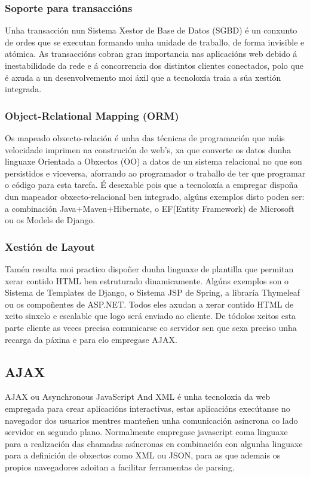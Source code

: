         \subsubsection{Soporte para transaccións}
            Unha transacción nun Sistema Xestor de Base de Datos (SGBD) é un conxunto de ordes que
            se executan formando unha unidade de traballo, de forma invisible e atómica. 
            As transaccións cobran gran importancia nas aplicacións web debido á inestabilidade 
            da rede e á concorrencia dos distintos clientes conectados, polo que é axuda a un 
            desenvolvemento moi áxil que a tecnoloxía traia a súa xestión integrada.
        
        \subsubsection{Object-Relational Mapping (ORM)}
            Os mapeado obxecto-relación é unha das técnicas de programación que máis velocidade imprimen
            na construción de web's, xa que converte os datos dunha linguaxe Orientada a Obxectos (OO) a 
            datos de un sistema relacional no que son persistidos e viceversa, aforrando ao programador
            o traballo de ter que programar o código para esta tarefa. É desexable pois que a tecnoloxía
            a empregar dispoña dun mapeador obxecto-relacional ben integrado, algúns exemplos disto poden
            ser: a combinación Java+Maven+Hibernate, o EF(Entity Framework) de Microsoft ou os 
            Models de Django.
        
        \subsubsection{Xestión de Layout}
            Tamén resulta moi practico dispoñer dunha linguaxe de plantilla que permitan xerar contido
            HTML ben estruturado dinamicamente. Algúns exemplos son o Sistema de Templates de Django, o 
            Sistema JSP de Spring, a libraría Thymeleaf ou os compoñentes de ASP.NET. Todos eles axudan 
            a xerar contido HTML de xeito sinxelo e escalable que logo será enviado ao cliente. De
            tódolos xeitos esta parte cliente as veces precisa comunicarse co servidor sen que sexa 
            preciso unha recarga da páxina e para elo empregase AJAX.
		
    \subsection{AJAX}
		AJAX ou Asynchronous JavaScript And XML é unha tecnoloxía da web empregada para crear 
		aplicacións interactivas, estas aplicacións execútanse no navegador dos usuarios mentres 
		manteñen unha comunicación asíncrona co lado servidor en segundo plano. Normalmente 
		empregase javascript coma linguaxe para a realización das chamadas asíncronas en combinación
		con algunha linguaxe para a definición de obxectos como XML ou JSON, para as que ademais os
		propios navegadores adoitan a facilitar ferramentas de parsing.
		

